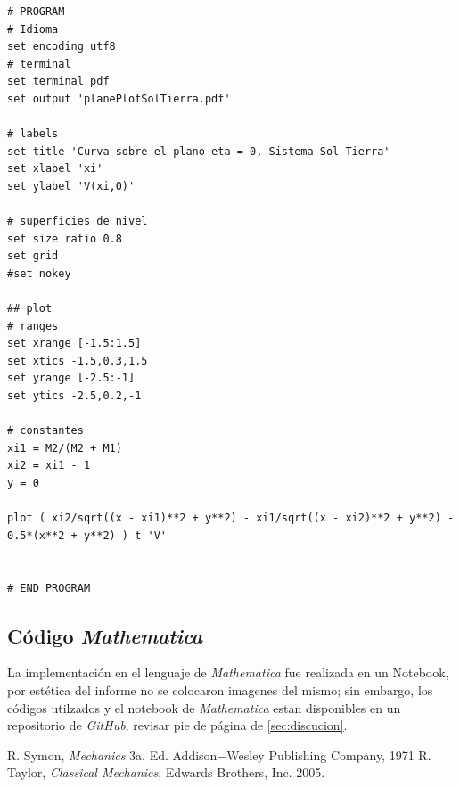 \begin{multicols}{2}
\begin{lstlisting}
# PROGRAM
# Idioma
set encoding utf8
# terminal
set terminal pdf
set output 'planePlotSolTierra.pdf'

# labels
set title 'Curva sobre el plano eta = 0, Sistema Sol-Tierra'
set xlabel 'xi'
set ylabel 'V(xi,0)'

# superficies de nivel
set size ratio 0.8
set grid
#set nokey

## plot
# ranges
set xrange [-1.5:1.5]
set xtics -1.5,0.3,1.5
set yrange [-2.5:-1]
set ytics -2.5,0.2,-1

# constantes
xi1 = M2/(M2 + M1)
xi2 = xi1 - 1
y = 0

plot ( xi2/sqrt((x - xi1)**2 + y**2) - xi1/sqrt((x - xi2)**2 + y**2) - 0.5*(x**2 + y**2) ) t 'V'


# END PROGRAM
\end{lstlisting}
\end{multicols}



\subsection{Código \textit{Mathematica}}
La implementación en el lenguaje de \textit{Mathematica} fue realizada en un Notebook, por estética del informe no se colocaron imagenes del mismo; sin embargo, los códigos utilzados y el notebook de \textit{Mathematica} estan disponibles en un repositorio de \textit{GitHub}, revisar pie de página de \ref{sec:discucion}.



\nocite{*}
%
%

\begin{thebibliography}{00}
 R. Symon, \textit{Mechanics} 3a. Ed. Addison$-$Wesley Publishing Company, 1971
 R. Taylor, \textit{Classical Mechanics}, Edwards Brothers, Inc. 2005.
\end{thebibliography}






